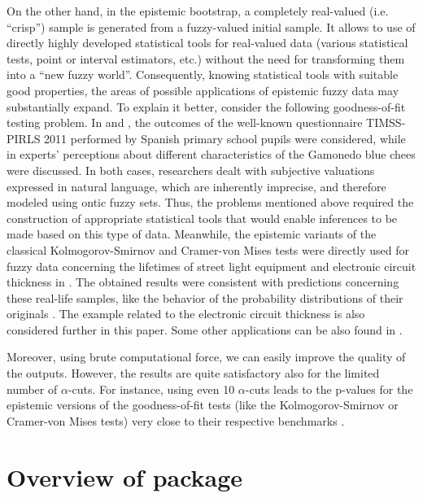 On the other hand, in the epistemic bootstrap, a completely real-valued (i.e. ``crisp'') sample is generated from a fuzzy-valued initial sample.
It allows to use of directly highly developed statistical tools for real-valued data (various statistical tests, point or interval estimators, etc.) without the need for transforming them into a ``new fuzzy world''. 
Consequently, knowing statistical tools with suitable good properties, the areas of possible applications of epistemic fuzzy data may substantially expand.
To explain it better, consider the following goodness-of-fit testing problem. In \cite{LUBIANO2016918} and \cite{lubiano2017}, the outcomes of the well-known questionnaire TIMSS-PIRLS 2011 performed by Spanish primary school pupils were considered, while in  \cite{Ramos-Guajardo2019} experts' perceptions about different characteristics of the Gamonedo blue chees were discussed. In both cases, researchers dealt with subjective valuations expressed in natural language, which are inherently imprecise, and therefore modeled using ontic fuzzy sets. Thus, the problems mentioned above required the construction of appropriate statistical tools that would enable inferences to be made based on this type of data.
Meanwhile, the epistemic variants of the classical Kolmogorov-Smirnov and Cramer-von Mises tests were directly used for fuzzy data concerning the lifetimes of street light equipment \citep{Hesamian2013} and electronic circuit thickness \citep{FARAZ20102684} in \cite{PGMR2024AMS}.
The obtained results were consistent with predictions concerning these real-life samples, like the behavior of the probability distributions of their originals \citep{Gibbons2010}.
The example related to the electronic circuit thickness is also considered further in this paper.
Some other applications can be also found in \citep{10.1007/978-3-031-08974-9_39,pgmr2022,GrzegorzewskiRom2021,PGMR2024AMS}.

Moreover, using brute computational force, we can easily improve the quality of the outputs.
However, the results are quite satisfactory also for the limited number of $\alpha$-cuts.
For instance, using even 10 $\alpha$-cuts leads to the p-values for the epistemic versions of the goodness-of-fit tests (like the Kolmogorov-Smirnov or Cramer-von Mises tests) very close to their respective benchmarks \citep{PGMR2024AMS}.




\section{Overview of  package}
\label{overview}

